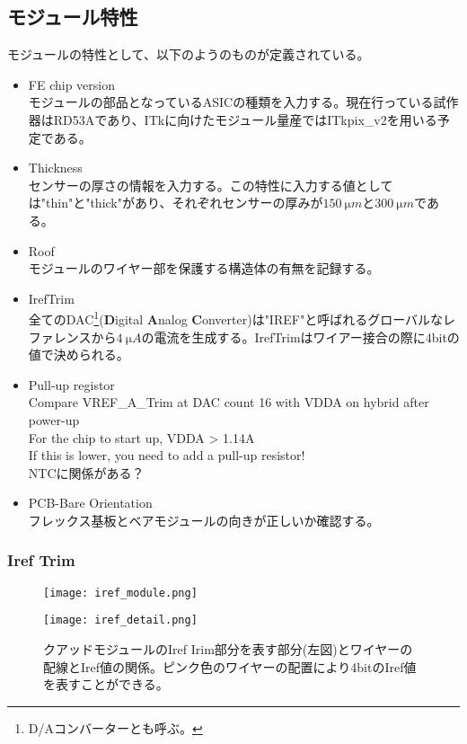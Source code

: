 \subsection{モジュール特性}
\label{sec:module-prop}
モジュールの特性として、以下のようのものが定義されている。
\begin{itemize}
  \item FE chip version \\
  モジュールの部品となっているASICの種類を入力する。現在行っている試作器はRD53Aであり、ITkに向けたモジュール量産ではITkpix\_v2を用いる予定である。
  \item Thickness \\
  センサーの厚さの情報を入力する。この特性に入力する値としては"thin"と"thick"があり、それぞれセンサーの厚みが$150\ \si{\micro m}$と$300\ \si{\micro m}$である。
  \item Roof \\
  モジュールのワイヤー部を保護する構造体の有無を記録する。
  \item IrefTrim\\
  全てのDAC\footnote{D/Aコンバーターとも呼ぶ。}(\textbf{D}igital \textbf{A}nalog \textbf{C}onverter)は"IREF"と呼ばれるグローバルなレファレンスから$4\ \si{\micro A}$の電流を生成する。IrefTrimはワイアー接合の際に4bitの値で決められる。
  \item Pull-up registor\\
  Compare VREF\_A\_Trim at DAC count 16 with VDDA on hybrid after power-up \\
  For the chip to start up, VDDA > 1.14A\\
  If this is lower, you need to add a pull-up resistor!\\
  NTCに関係がある？ \\
  \item PCB-Bare Orientation \\
  フレックス基板とベアモジュールの向きが正しいか確認する。
\end{itemize}

\subsubsection{Iref Trim}
\begin{figure}[tbp]
  \begin{minipage}[b]{0.45\linewidth}
    \centering
    \texttt{[image: iref\_module.png]}
  \end{minipage}
  \begin{minipage}[b]{0.45\linewidth}
    \centering
    \texttt{[image: iref\_detail.png]}
  \end{minipage}
  \caption{クアッドモジュールのIref Irim部分を表す部分(左図)とワイヤーの配線とIref値の関係。ピンク色のワイヤーの配置により4bitのIref値を表すことができる。}
  \label{fig:iref-detail}
\end{figure}

